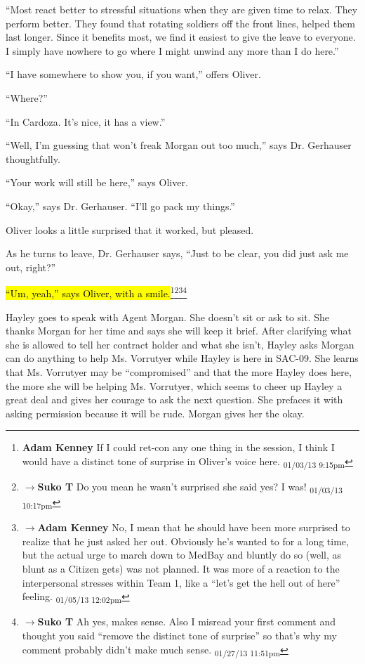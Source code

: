 ``Most react better to stressful situations when they are given time to relax.  They perform better.  They found that rotating soldiers off the front lines, helped them last longer.  Since it benefits most, we find it easiest to give the leave to everyone. I simply have nowhere to go where I might unwind any more than I do here.''

``I have somewhere to show you, if you want,'' offers Oliver.

``Where?''

``In Cardoza.  It's nice, it has a view.''

``Well, I'm guessing that won't freak Morgan out too much,'' says Dr. Gerhauser thoughtfully.

``Your work will still be here,'' says Oliver.

``Okay,'' says Dr. Gerhauser. ``I'll go pack my things.''

Oliver looks a little surprised that it worked, but pleased.

As he turns to leave, Dr. Gerhauser says, ``Just to be clear, you did just ask me out, right?''

\hl{``Um, yeah,'' says Oliver, with a smile.}\footnote{\textbf{Adam Kenney }If I could ret-con any one thing in the session, I think I would have a distinct tone of surprise in Oliver's voice here. \textsubscript{01/03/13 9:15pm}}\footnote{$\rightarrow$\textbf{Suko T }Do you mean he wasn't surprised she said yes?  I was! \textsubscript{01/03/13 10:17pm}}\footnote{$\rightarrow$\textbf{Adam Kenney }No, I mean that he should have been more surprised to realize that he just asked her out.  Obviously he's wanted to for a long time, but the actual urge to march down to MedBay and bluntly do so (well, as blunt as a Citizen gets) was not planned. It was more of a reaction to the interpersonal stresses within Team 1, like a ``let's get the hell out of here'' feeling. \textsubscript{01/05/13 12:02pm}}\footnote{$\rightarrow$\textbf{Suko T }Ah yes, makes sense.  Also I misread your first comment and thought you said ``remove the distinct tone of surprise'' so that's why my comment probably didn't make much sense. \textsubscript{01/27/13 11:51pm}}



Hayley goes to speak with Agent Morgan.  She doesn't sit or ask to sit.  She thanks Morgan for her time and says she will keep it brief.  After clarifying what she is allowed to tell her contract holder and what she isn't, Hayley asks Morgan can do anything to help Ms. Vorrutyer while Hayley is here in SAC-09.   She learns that Ms. Vorrutyer may be ``compromised'' and that the more Hayley does here, the more she will be helping Ms. Vorrutyer, which seems to cheer up Hayley a great deal and gives her courage to ask the next question.  She prefaces it with asking permission because it will be rude.  Morgan gives her the okay.

